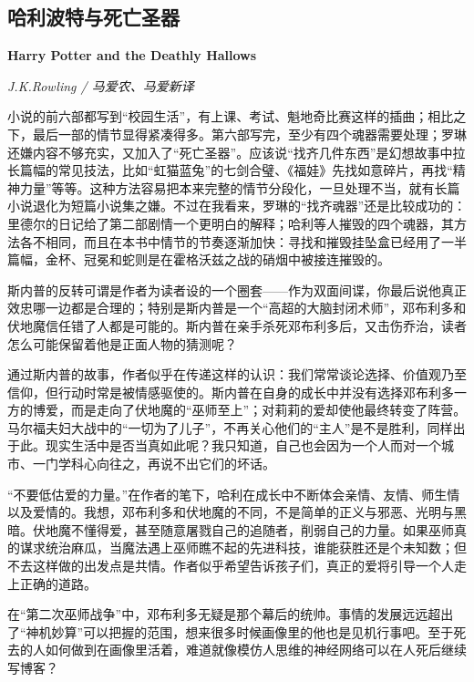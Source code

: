 \subsection*{哈利波特与死亡圣器}
\par \textbf{Harry Potter and the Deathly Hallows}
\par \emph{J.K.Rowling / 马爱农、马爱新译} 
\par 小说的前六部都写到“校园生活”，有上课、考试、魁地奇比赛这样的插曲；相比之下，最后一部的情节显得紧凑得多。第六部写完，至少有四个魂器需要处理；罗琳还嫌内容不够充实，又加入了“死亡圣器”。应该说“找齐几件东西”是幻想故事中拉长篇幅的常见技法，比如“虹猫蓝兔”的七剑合璧、《福娃》先找如意碎片，再找“精神力量”等等。这种方法容易把本来完整的情节分段化，一旦处理不当，就有长篇小说退化为短篇小说集之嫌。不过在我看来，罗琳的“找齐魂器”还是比较成功的：里德尔的日记给了第二部剧情一个更明白的解释；哈利等人摧毁的四个魂器，其方法各不相同，而且在本书中情节的节奏逐渐加快：寻找和摧毁挂坠盒已经用了一半篇幅，金杯、冠冕和蛇则是在霍格沃兹之战的硝烟中被接连摧毁的。
\par 斯内普的反转可谓是作者为读者设的一个圈套——作为双面间谍，你最后说他真正效忠哪一边都是合理的；特别是斯内普是一个“高超的大脑封闭术师”，邓布利多和伏地魔信任错了人都是可能的。斯内普在亲手杀死邓布利多后，又击伤乔治，读者怎么可能保留着他是正面人物的猜测呢？
\par 通过斯内普的故事，作者似乎在传递这样的认识：我们常常谈论选择、价值观乃至信仰，但行动时常是被情感驱使的。斯内普在自身的成长中并没有选择邓布利多一方的博爱，而是走向了伏地魔的“巫师至上”；对莉莉的爱却使他最终转变了阵营。马尔福夫妇大战中的“一切为了儿子”，不再关心他们的“主人”是不是胜利，同样出于此。现实生活中是否当真如此呢？我只知道，自己也会因为一个人而对一个城市、一门学科心向往之，再说不出它们的坏话。
\par “不要低估爱的力量。”在作者的笔下，哈利在成长中不断体会亲情、友情、师生情以及爱情的。我想，邓布利多和伏地魔的不同，不是简单的正义与邪恶、光明与黑暗。伏地魔不懂得爱，甚至随意屠戮自己的追随者，削弱自己的力量。如果巫师真的谋求统治麻瓜，当魔法遇上巫师瞧不起的先进科技，谁能获胜还是个未知数；但不去这样做的出发点是共情。作者似乎希望告诉孩子们，真正的爱将引导一个人走上正确的道路。
\par 在“第二次巫师战争”中，邓布利多无疑是那个幕后的统帅。事情的发展远远超出了“神机妙算”可以把握的范围，想来很多时候画像里的他也是见机行事吧。至于死去的人如何做到在画像里活着，难道就像模仿人思维的神经网络可以在人死后继续写博客？
\par {}

